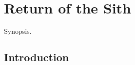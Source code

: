 \chapter{Return of the Sith}

\graphicspath{{figures/chapter-4/}}


\begin{synopsis}
	Synopsis.
\end{synopsis}


\section{Introduction}

\lipsum[15-19]
\cite{Salmon2006}

